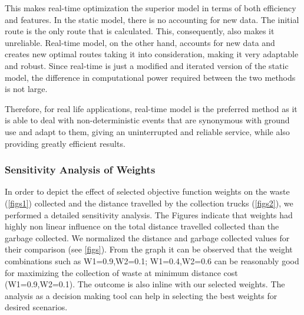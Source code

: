 \documentclass[12pt]{article}
\begin{document}
This makes real-time optimization the superior model in terms of both efficiency and features. In the static model, there is no accounting for new data. The initial route is the only route that is calculated. This, consequently, also makes it unreliable. Real-time model, on the other hand, accounts for new data and creates new optimal routes taking it into consideration, making it very adaptable and robust. Since real-time is just a modified and iterated version of the static model, the difference in computational power required between the two methods is not large. 

Therefore, for real life applications, real-time model is the preferred method as it is able to deal with non-deterministic events that are synonymous with ground use and adapt to them, giving an uninterrupted and reliable service, while also providing greatly efficient results.


 
\subsubsection*{Sensitivity Analysis of Weights}
In order to depict the effect of selected objective function weights on the waste  (\ref{figs1})  collected and the distance travelled by the collection trucks (\ref{figs2}), we performed a detailed sensitivity analysis. The Figures indicate that weights had highly non linear influence on the total distance travelled collected than the garbage collected. We normalized the distance and garbage collected values for their comparison (see \ref{figs}). From the graph it can be observed that the weight combinations such as W1=0.9,W2=0.1; W1=0.4,W2=0.6 can be reasonably good for maximizing the collection of waste at minimum distance cost (W1=0.9,W2=0.1). The outcome is also inline with our selected weights. The analysis as a decision making tool can help  in selecting the best weights for desired scenarios.
\end{document}
